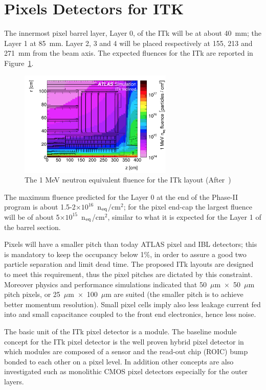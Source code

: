 \section{Pixels Detectors for ITK}
\label{sec:ITkPixels}

The innermost pixel barrel layer, Layer 0, of the ITk will be at about 40~mm; the Layer 1 at 85~mm. 
Layer 2, 3 and 4 will be placed respectively at 155, 213 and 271~mm from the beam axis. 
The expected fluences for the ITk are reported in Figure~\ref{fig:ITk_Fluence}.

\begin{figure}[!htpb]
\centering
\includegraphics[width=0.65\textwidth]{ITk_Fluence.png}
\caption{\label{fig:ITk_Fluence} The 1 MeV neutron equivalent fluence  for the ITk layout 
(After~\cite{ITkStripsTDR})}
\end{figure}

The maximum fluence predicted for the Layer 0 at the end of the Phase-II program is about 1.5-2$\times10^{16}$~n$_{\rm eq}$/cm$^2$; for the pixel end-cap the largest fluence will be  of about 
5$\times10^{15}$~n$_{\rm eq}$/cm$^2$, similar to what it is expected for the Layer 1 of the barrel section.

Pixels will have a smaller pitch than today ATLAS pixel and IBL detectors; this is mandatory to keep  the 
occupancy below 1\%, in order to assure a good two particle separation and limit dead time. 
The proposed ITk layouts are designed to meet this requirement, thus the pixel pitches 
are dictated by this constraint. 
Moreover physics and performance simulations indicated that   50~$\mu$m~$\times$~50~$\mu$m pitch 
pixels, or 25~$\mu$m~$\times$~100~$\mu$m are suited (the smaller pitch is to achieve better 
momentum resolution).
Small pixel cells imply also less leakage current fed into and small capacitance coupled to the front end 
electronics, hence less noise. 


The basic  unit of the ITk pixel detector is a module. The baseline module concept for the ITk pixel detector is the well proven hybrid pixel detector in which modules are composed of a sensor and the read-out chip (ROIC) bump bonded to each other on a pixel level. In addition other concepts are also investigated such as monolithic CMOS pixel detectors especially for the outer layers.





